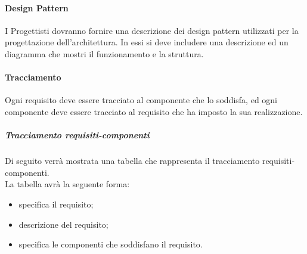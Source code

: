 
\paragraph{Design Pattern}
\label{}
I Progettisti dovranno fornire una descrizione dei design pattern utilizzati per la progettazione dell'architettura. In essi si deve includere una descrizione ed un diagramma che mostri il funzionamento e la struttura.



\paragraph{Tracciamento}
\label{}
Ogni requisito deve essere tracciato al componente che lo soddisfa, ed ogni componente deve essere tracciato al requisito che ha imposto la sua realizzazione.

\subparagraph{Tracciamento requisiti-componenti}
Di seguito verrà mostrata una tabella che rappresenta il tracciamento requisiti-componenti. \\
La tabella avrà la seguente forma:
\begin{itemize}
\item {}specifica il requisito;
\item {}descrizione del requisito;
\item {}specifica le componenti che soddisfano il requisito.
\end{itemize}

